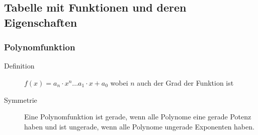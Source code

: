 \documentclass[a4paper]{scrartcl}
\begin{document}
    \subsection{Tabelle mit Funktionen und deren Eigenschaften}
        \subsubsection{Polynomfunktion}        
        \begin{description}
            \item[Definition] $f(x) = a_n \cdot x^n...a_1 \cdot x + a_0$ wobei $n$ auch der Grad der Funktion ist
            \item[Symmetrie] Eine Polynomfunktion ist gerade, wenn alle Polynome eine gerade Potenz haben und ist ungerade, wenn alle Polynome ungerade Exponenten haben.
        \end{description}
\end{document}
